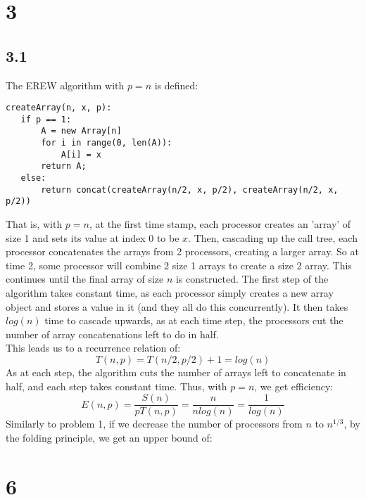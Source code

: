 \documentclass[letterpaper,notitlepage,twoside]{article}
\begin{document}
\section*{3}

\subsection*{3.1}
The EREW algorithm with $p=n$ is defined:
\begin{verbatim}
createArray(n, x, p):
   if p == 1:
       A = new Array[n]
       for i in range(0, len(A)):
           A[i] = x
       return A;
   else:
       return concat(createArray(n/2, x, p/2), createArray(n/2, x, p/2))
\end{verbatim}
That is, with $p=n$, at the first time stamp, each processor creates an 'array' of size 1 and sets its value at index 0 to be $x$. Then, cascading up the call tree, each processor concatenates the arrays from 2 processors, creating a larger array. So at time 2, some processor will combine 2 size 1 arrays to create a size 2 array. This continues until the final array of size $n$ is constructed. The first step of the algorithm takes constant time, as each processor simply creates a new array object and stores a value in it (and they all do this concurrently). It then takes $log(n)$ time to cascade upwards, as at each time step, the processors cut the number of array concatenations left to do in half. \\
This leads us to a recurrence relation of:
$$T(n, p) = T(n/2, p/2) + 1 = log(n)$$
As at each step, the algorithm cuts the number of arrays left to concatenate in half, and each step takes constant time. Thus, with $p=n$, we get efficiency:
$$ E(n, p) = \frac{S(n)}{pT(n, p)} = \frac{n}{nlog(n)} = \frac{1}{log(n)}$$ 
Similarly to problem 1, if we decrease the number of processors from $n$ to $n^{1/3}$, by the folding principle, we get an upper bound of: 


\section*{6}
\end{document}
